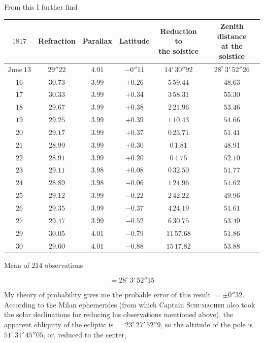\par\indent From this I further find

\begin{center}\fontsize{9}{11}\selectfont\setlength{\tabcolsep}{3pt}\begin{tabular}{c|c|c|c|c|c}
$1817$ & Refraction & Parallax & Latitude & \shortstack{Reduction to\\the solstice} & \shortstack{Zenith distance\\at the solstice}\\
\hline$\text{June}\ 13$ & $29''22$ & $4.01$ & $-0''11$ & $14'\,30''92$ & $28^\circ\,3'\,52''26$\\
$16$ & $30.73$ & $3.99$ & $+0.26$ & $5\,59.44$ & $48.63$\\
$17$ & $30.33$ & $3.99$ & $+0.34$ & $3\,58.31$ & $55.30$\\
$18$ & $29.67$ & $3.99$ & $+0.38$ & $2\,21.96$ & $53.46$\\
$19$ & $29.25$ & $3.99$ & $+0.39$ & $1\,10.43$ & $54.66$\\
$20$ & $29.17$ & $3.99$ & $+0.37$ & $0\,23.71$ & $51.41$\\
$21$ & $28.99$ & $3.99$ & $+0.30$ & $0\,1.81$ & $48.91$\\
$22$ & $28.91$ & $3.99$ & $+0.20$ & $0\,4.75$ & $52.10$\\
$23$ & $29.11$ & $3.98$ & $+0.08$ & $0\,32.50$ & $51.77$\\
$24$ & $28.89$ & $3.98$ & $-0.06$ & $1\,24.96$ & $51.62$\\
$25$ & $29.12$ & $3.99$ & $-0.22$ & $2\,42.22$ & $49.96$\\
$26$ & $29.35$ & $3.99$ & $-0.37$ & $4\,24.19$ & $51.61$\\
$27$ & $29.47$ & $3.99$ & $-0.52$ & $6\,30.75$ & $53.49$\\
$29$ & $30.05$ & $4.01$ & $-0.79$ & $11\,57.68$ & $51.86$\\
$30$ & $29.60$ & $4.01$ & $-0.88$ & $15\,17.82$ & $53.88$\\
\end{tabular}\end{center}

\par\indent Mean of 214 observations

\[ = 28^\circ\,3'\,52''15 \]

\par\indent My theory of probability gives me the probable error of this result $= \pm 0''32$. According to the Milan ephemerides (from which Captain \textsc{Schumacher} also took the solar declinations for reducing his observations mentioned above), the apparent obliquity of the ecliptic is $= 23^\circ\,27'\,52''9$, so the altitude of the pole is $51^\circ\,31'\,45''05$, or, reduced to the center,

